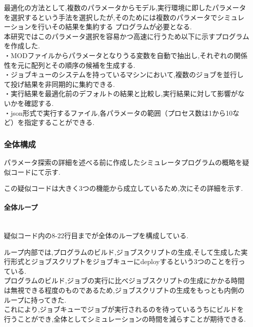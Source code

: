 最適化の方法として,複数のパラメータからモデル,実行環境に即したパラメータを選択するという手法を選択したが,そのためには複数のパラメータでシミュレーションを行いその結果を集約する
プログラムが必要となる.\\
本研究ではこのパラメータ選択を容易かつ高速に行うため以下に示すプログラムを作成した.\\
・MODファイルからパラメータとなりうる変数を自動で抽出し,それぞれの関係性を元に配列とその順序の候補を生成する.\\
・ジョブキューのシステムを持っているマシンにおいて,複数のジョブを並行して投げ結果を非同期的に集約できる.\\
・実行結果を最適化前のデフォルトの結果と比較し,実行結果に対して影響がないかを確認する.\\
・json形式で実行するファイル,各パラメータの範囲（プロセス数は1から10など）を指定することができる.\\
\subsubsection{全体構成}
パラメータ探索の詳細を述べる前に作成したシミュレータプログラムの概略を疑似コードにて示す.\\
{\footnotesize

}
この疑似コードは大きく3つの機能から成立しているため,次にその詳細を示す.\\
\paragraph{全体ループ}~\\
疑似コード内の8-22行目までが全体のループを構成している.\\
{\footnotesize

}
ループ内部では,プログラムのビルド,ジョブスクリプトの生成,そして生成した実行形式とジョブスクリプトをジョブキューにdeployするという3つのことを行っている.\\
プログラムのビルド,ジョブの実行に比べジョブスクリプトの生成にかかる時間は無視できる程度のものであるため,ジョブスクリプトの生成をもっとも内側のループに持ってきた.\\
これにより,ジョブキューでジョブが実行されるのを待っているうちにビルドを行うことができ,全体としてシミュレーションの時間を減らすことが期待できる.\\
